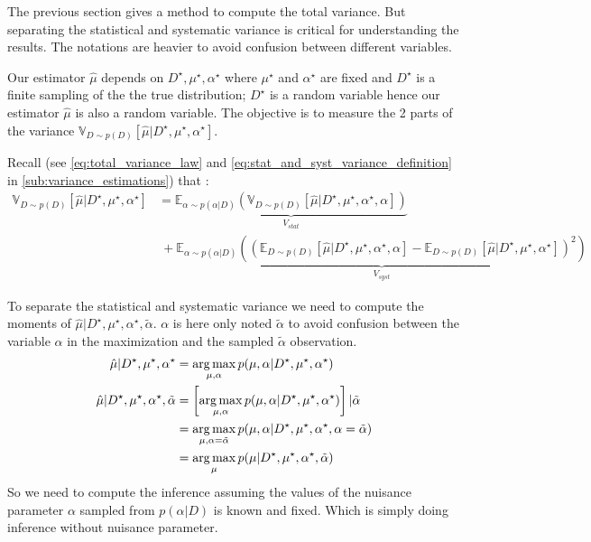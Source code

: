 
The previous section gives a method to compute the total variance.
But separating the statistical and systematic variance is critical for understanding the results.
The notations are heavier to avoid confusion between different variables.

Our estimator $\hat \mu$ depends on $D^\star, \mu^\star, \alpha^\star$ where $\mu^\star$ and $\alpha^\star$ are fixed and $D^\star$ is a finite sampling of the the true distribution;
$D^\star$ is a random variable hence our estimator $\hat \mu$ is also a random variable.
The objective is to measure the 2 parts of the variance $\mathbb{V}_{D\sim p(D)}[\hat \mu | D^\star, \mu^\star, \alpha^\star]$.

Recall (see \autoref{eq:total_variance_law} and \autoref{eq:stat_and_syst_variance_definition} in \autoref{sub:variance_estimations}) that :
\begin{align}
\mathbb{V}_{D\sim p(D)}[\hat \mu | D^\star, \mu^\star, \alpha^\star] 
 & = \underbrace{\mathbb{E}_{\alpha \sim p(\alpha|D)} \left (\mathbb{V}_{D\sim p(D)}[\hat \mu | D^\star, \mu^\star, \alpha^\star, \alpha] \right )}_{V_{stat}} \\
 & ~ + \underbrace{\mathbb{E}_{\alpha \sim p(\alpha|D)} \left ( (\mathbb{E}_{D\sim p(D)} [\hat \mu | D^\star, \mu^\star, \alpha^\star, \alpha]  - \mathbb{E}_{D\sim p(D)}[\hat \mu | D^\star, \mu^\star, \alpha^\star])^2\right )}_{V_{syst}}
\end{align}

To separate the statistical and systematic variance we need to compute the moments of $\hat \mu | D^\star, \mu^\star, \alpha^\star, \tilde \alpha$.
$\alpha$ is here only noted $\tilde \alpha$ to avoid confusion between the variable $\alpha$ in the maximization and the sampled $\tilde \alpha$ observation. 
\begin{align}
\hat \mu | D^\star, \mu^\star, \alpha^\star & = \operatorname*{arg\,max}_{\mu, \alpha} p(\mu, \alpha| D^\star, \mu^\star, \alpha^\star) \\
\hat \mu | D^\star, \mu^\star, \alpha^\star, \tilde \alpha & = \left[ \operatorname*{arg\,max}_{\mu, \alpha} p(\mu, \alpha| D^\star, \mu^\star, \alpha^\star) \right] | \tilde \alpha \\
	& = \operatorname*{arg\,max}_{\mu, \alpha=\tilde \alpha} p(\mu, \alpha| D^\star, \mu^\star, \alpha^\star, \alpha = \tilde \alpha) \\
	& = \operatorname*{arg\,max}_{\mu} p(\mu | D^\star, \mu^\star, \alpha^\star, \tilde \alpha) \\
\end{align}
So we need to compute the inference assuming the values of the nuisance parameter $\alpha$ sampled from $p(\alpha|D)$ is known and fixed.
Which is simply doing inference without nuisance parameter.








